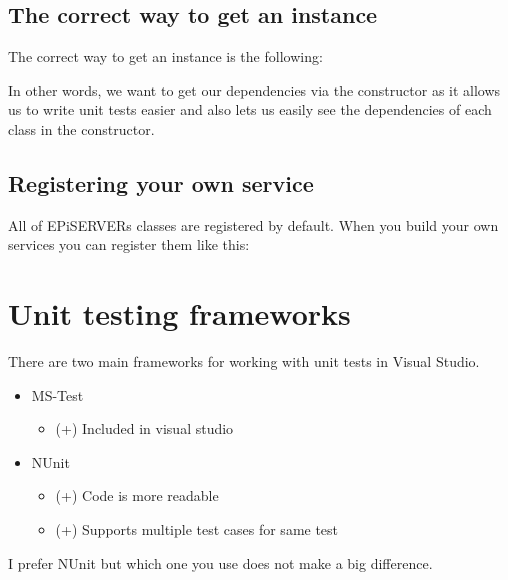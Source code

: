 \documentclass[12pt]{article}
\begin{document}
\subsection{The correct way to get an instance}
The correct way to get an instance is the following:


In other words, we want to get our dependencies via the constructor as it allows us to write unit tests easier and also lets us easily see the dependencies of each class in the constructor.

\subsection{Registering your own service}
All of EPiSERVERs classes are registered by default. When you build your own services you can register them like this:


\section{Unit testing frameworks}
There are two main frameworks for working with unit tests in Visual Studio.
\begin{itemize}
	\item MS-Test
	\begin{itemize}
		\item (+) Included in visual studio
	\end{itemize}
	\item NUnit
	\begin{itemize}
		\item (+) Code is more readable
		\item (+) Supports multiple test cases for same test
	\end{itemize}
\end{itemize}

I prefer NUnit but which one you use does not make a big difference.
\end{document}
